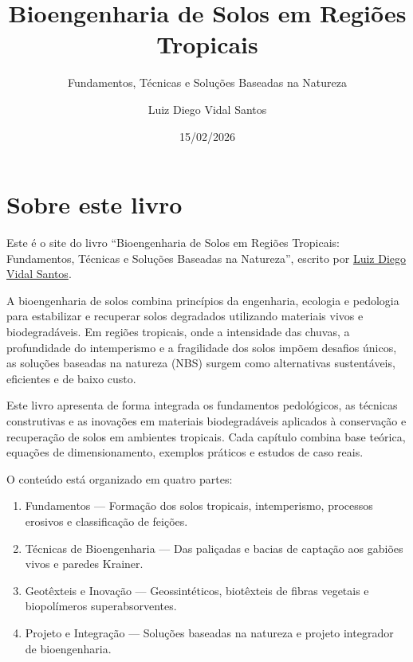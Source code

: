 \documentclass[
  portuguese,
  11pt,
  a4paper,
  open=any]{scrbook}
\title{Bioengenharia de Solos em Regiões Tropicais}
\subtitle{Fundamentos, Técnicas e Soluções Baseadas na Natureza}
\author{Luiz Diego Vidal Santos}
\date{15/02/2026}
\providecommand{\tightlist}{%
  \setlength{\itemsep}{0pt}\setlength{\parskip}{0pt}}
\renewcommand*\contentsname{Índice}
\newcommand\contentsname{Índice}
\begin{document}
\frontmatter
\maketitle

\renewcommand*\contentsname{Índice}
{
\hypersetup{linkcolor=}
\setcounter{tocdepth}{2}
\tableofcontents
}

\mainmatter
{}

\chapter*{Sobre este livro}\label{sobre-este-livro}


Este é o site do livro ``Bioengenharia de Solos em Regiões Tropicais:
Fundamentos, Técnicas e Soluções Baseadas na Natureza'', escrito por
\href{https://diegovidalcv.com.br/}{Luiz Diego Vidal Santos}.

A bioengenharia de solos combina princípios da engenharia, ecologia e
pedologia para estabilizar e recuperar solos degradados utilizando
materiais vivos e biodegradáveis. Em regiões tropicais, onde a
intensidade das chuvas, a profundidade do intemperismo e a fragilidade
dos solos impõem desafios únicos, as soluções baseadas na natureza (NBS)
surgem como alternativas sustentáveis, eficientes e de baixo custo.

Este livro apresenta de forma integrada os fundamentos pedológicos, as
técnicas construtivas e as inovações em materiais biodegradáveis
aplicados à conservação e recuperação de solos em ambientes tropicais.
Cada capítulo combina base teórica, equações de dimensionamento,
exemplos práticos e estudos de caso reais.

O conteúdo está organizado em quatro partes:

\begin{enumerate}
\def\labelenumi{\arabic{enumi}.}
\tightlist
\item
  Fundamentos --- Formação dos solos tropicais, intemperismo, processos
  erosivos e classificação de feições.
\item
  Técnicas de Bioengenharia --- Das paliçadas e bacias de captação aos
  gabiões vivos e paredes Krainer.
\item
  Geotêxteis e Inovação --- Geossintéticos, biotêxteis de fibras
  vegetais e biopolímeros superabsorventes.
\item
  Projeto e Integração --- Soluções baseadas na natureza e projeto
  integrador de bioengenharia.
\end{enumerate}
\end{document}
